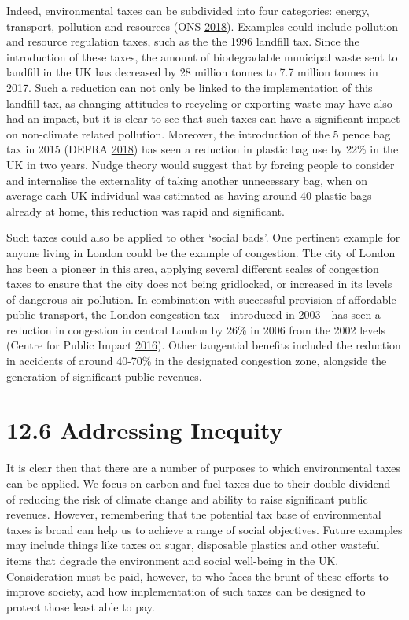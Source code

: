 \documentclass[]{tufte-handout}
\begin{document}
Indeed, environmental taxes can be subdivided into four categories:
energy, transport, pollution and resources (ONS
\protect\hyperlink{ref-ONS2018}{2018}). Examples could include pollution
and resource regulation taxes, such as the the 1996 landfill tax. Since
the introduction of these taxes, the amount of biodegradable municipal
waste sent to landfill in the UK has decreased by 28 million tonnes to
7.7 million tonnes in 2017. Such a reduction can not only be linked to
the implementation of this landfill tax, as changing attitudes to
recycling or exporting waste may have also had an impact, but it is
clear to see that such taxes can have a significant impact on
non-climate related pollution. Moreover, the introduction of the 5 pence
bag tax in 2015 (DEFRA \protect\hyperlink{ref-DEFRA2018}{2018}) has seen
a reduction in plastic bag use by 22\% in the UK in two years. Nudge
theory would suggest that by forcing people to consider and internalise
the externality of taking another unnecessary bag, when on average each
UK individual was estimated as having around 40 plastic bags already at
home, this reduction was rapid and significant.

Such taxes could also be applied to other `social bads'. One pertinent
example for anyone living in London could be the example of congestion.
The city of London has been a pioneer in this area, applying several
different scales of congestion taxes to ensure that the city does not
being gridlocked, or increased in its levels of dangerous air pollution.
In combination with successful provision of affordable public transport,
the London congestion tax - introduced in 2003 - has seen a reduction in
congestion in central London by 26\% in 2006 from the 2002 levels
(Centre for Public Impact
\protect\hyperlink{ref-CentreforPublicImpact2016}{2016}). Other
tangential benefits included the reduction in accidents of around
40-70\% in the designated congestion zone, alongside the generation of
significant public revenues.

\hypertarget{addressing-inequity}{%
\section{12.6 Addressing Inequity}\label{addressing-inequity}}

It is clear then that there are a number of purposes to which
environmental taxes can be applied. We focus on carbon and fuel taxes
due to their double dividend of reducing the risk of climate change and
ability to raise significant public revenues. However, remembering that
the potential tax base of environmental taxes is broad can help us to
achieve a range of social objectives. Future examples may include things
like taxes on sugar, disposable plastics and other wasteful items that
degrade the environment and social well-being in the UK. Consideration
must be paid, however, to who faces the brunt of these efforts to
improve society, and how implementation of such taxes can be designed to
protect those least able to pay.
\end{document}
